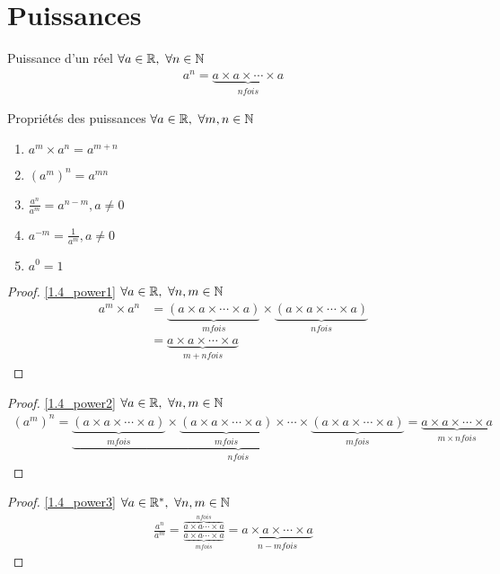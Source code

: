 \section{Puissances}
\begin{definition}{Puissance d'un réel}
	$\forall a \in \mathbb{R},\ \forall n \in \mathbb{N}$
	\begin{align*}
		a^n = \underbrace{a \times a \times \cdots \times a}_{n fois}
	\end{align*}
\end{definition}
\clearpage
\begin{proposition}{Propriétés des puissances}
	$\forall a \in \mathbb{R},\ \forall m, n \in \mathbb{N}$
	\begin{enumerate}
		\item \label{1.4_power1} $a^m \times a^n = a^{m + n}$
		\item \label{1.4_power2} $(a^m)^n = a^{mn}$
		\item \label{1.4_power3} $\displaystyle{\frac{a^n}{a^m}} = a^{n - m}, a \neq 0$
		\item \label{1.4_power4} $a^{-m} = \displaystyle{\frac{1}{a^m}}, a \neq 0$
		\item \label{1.4_power5} $a^0 = 1$
	\end{enumerate}
\end{proposition}

\begin{proof}
	\ref{1.4_power1} $\forall a \in \mathbb{R},\ \forall n, m \in \mathbb{N}$
	\begin{align*}
		a^m \times a^n &= \underbrace{(a \times a \times \cdots \times a)}_{m fois} \times \underbrace{(a \times a \times \cdots \times a)}_{n fois} \\
		&= \underbrace{a \times a \times \cdots \times a}_{m + n fois}
	\end{align*}
\end{proof}

\begin{proof}
	\ref{1.4_power2} $\forall a \in \mathbb{R},\ \forall n, m \in \mathbb{N}$
	\begin{align*}
		(a^m)^n = \underbrace{\underbrace{(a \times a \times \cdots \times a)}_{m fois} \times \underbrace{(a \times a \times \cdots \times a)}_{m fois} \times \cdots \times \underbrace{(a \times a \times \cdots \times a)}_{m fois}}_{n fois} = \underbrace{a \times a \times \cdots \times a}_{m \times n fois}
	\end{align*}
\end{proof}

\begin{proof}
	\ref{1.4_power3} $\forall a \in \mathbb{R}^*,\ \forall n, m \in \mathbb{N}$
	\begin{align*}
		\frac{a^n}{a^m} = \frac{\overbrace{a \times a \cdots \times a}^{n fois}}{\underbrace{a \times a \cdots \times a}_{m fois}} = \underbrace{a \times a \times \cdots \times a}_{n - m fois}
	\end{align*}
\end{proof}

